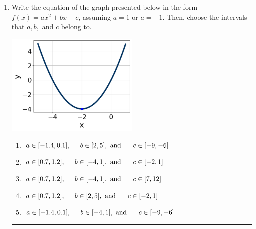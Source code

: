 \documentclass[14pt]{extbook}
\newcommand{\litem}[1]{\item#1\hspace*{-1cm}\rule{\textwidth}{0.4pt}}
\begin{document}
\begin{enumerate}
{\begin{enumerate}[label=\Alph*.]
\end{enumerate} }
\litem{
Write the equation of the graph presented below in the form $f(x)=ax^2+bx+c$, assuming  $a=1$ or $a=-1$. Then, choose the intervals that $a, b,$ and $c$ belong to.
\begin{center}
    \includegraphics[width=0.5\textwidth]{../Figures/quadraticGraphToEquationB.png}
\end{center}
\begin{enumerate}[label=\Alph*.]
\item \( a \in [-1.4, 0.1], \hspace*{5mm} b \in [2, 5], \text{ and } \hspace*{5mm} c \in [-9, -6] \)
\item \( a \in [0.7, 1.2], \hspace*{5mm} b \in [-4, 1], \text{ and } \hspace*{5mm} c \in [-2, 1] \)
\item \( a \in [0.7, 1.2], \hspace*{5mm} b \in [-4, 1], \text{ and } \hspace*{5mm} c \in [7, 12] \)
\item \( a \in [0.7, 1.2], \hspace*{5mm} b \in [2, 5], \text{ and } \hspace*{5mm} c \in [-2, 1] \)
\item \( a \in [-1.4, 0.1], \hspace*{5mm} b \in [-4, 1], \text{ and } \hspace*{5mm} c \in [-9, -6] \)


\end{enumerate}}
\end{enumerate}
\end{document}
